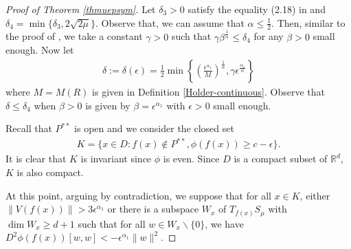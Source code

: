 \documentclass[10pt,a4paper]{article}
\theoremstyle{definition} \theoremstyle{remark}
\numberwithin{equation}{section}
\newcommand{\R}{\mathbb{R}}
\newcommand{\ga}{\gamma}
\newcommand{\ep}{\epsilon}
\begin{document}
\begin{proof}[Proof of Theorem \ref{thmuepsym}]
	Let $\delta_3 > 0$ satisfy the equality (2.18) in \cite{BCJN} and $\delta_4 = \min\{\delta_3,2\sqrt{2\mu}\}$. Observe that, we can assume that $\alpha \leq \frac12$. Then, similar to the proof of \cite[Theorem 2.1]{BCJN}, we take a constant $\ga > 0$ such that $\ga \beta^{\frac1\alpha} \leq \delta_4$ for any $\beta > 0$ small enough. Now let
	\begin{align} \label{eqdeltaep}
		\delta := \delta(\ep) = \frac12 \min\left\{ \left( \frac{\ep^{\alpha_1}}{M}\right) ^{\frac1\alpha}, \ga \ep^{\frac{\alpha_1}{\alpha}}\right\}
	\end{align}
	where $M = M(R)$ is given in Definition \ref{Holder-continuous}. Observe that $\delta \leq \delta_4$ when $\beta > 0$ is given by $\beta = \ep^{\alpha_1}$ with $\ep > 0$ small enough.
	
	Recall that $P^{**}$ is open and we consider the closed set
	\begin{align}
		K = \bigl\{x \in D: f(x) \notin P^{**}, \phi(f(x)) \geq c - \ep\bigr\}.
	\end{align}
	It is clear that $K$ is invariant since $\phi$ is even. Since $D$ is a compact subset of $\R^d$, $K$ is also compact.
	
	At this point, arguing by contradiction, we suppose that for all $x \in K$, either $\|V(f(x))\| > 3\ep^{\alpha_1}$ or there is a subspace $W_x$ of $T_{f(x)}S_\mu$ with $\dim W_x \geq d+1$ such that for all $w \in W_x \backslash \{0\}$, we have $D^2 \phi(f(x))[w,w] < -\ep^{\alpha_1}\|w\|^2$.
	

\end{proof}
\end{document}
